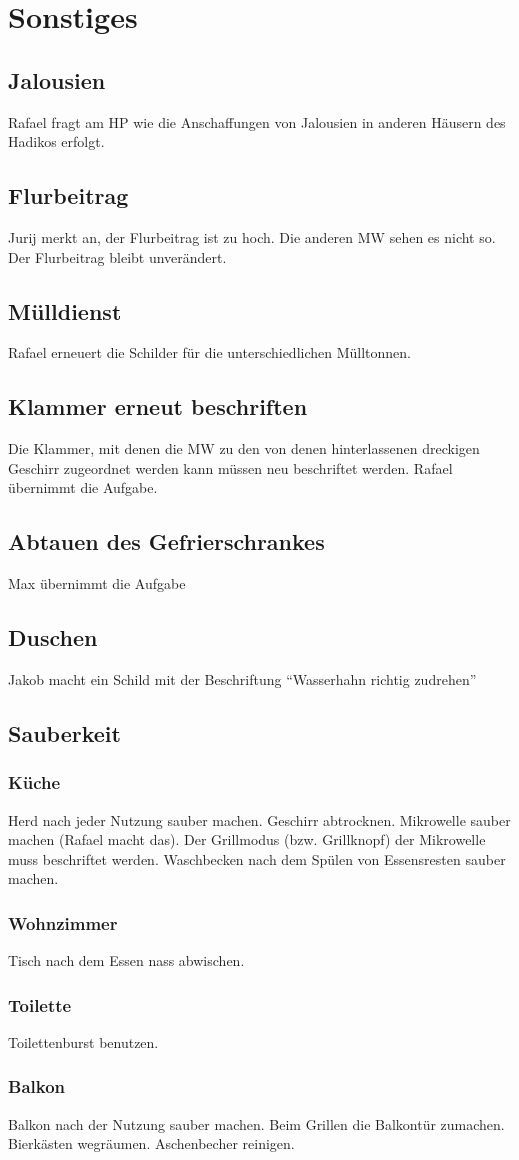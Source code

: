 \documentclass[10pt,a4paper,final]{article}
\begin{document}
\section{Sonstiges}
\subsection{Jalousien}
Rafael fragt am HP wie die Anschaffungen von Jalousien in anderen Häusern des Hadikos erfolgt.
\subsection{Flurbeitrag}
Jurij merkt an, der Flurbeitrag ist zu hoch. Die anderen MW sehen es nicht so. Der Flurbeitrag bleibt unverändert.
\subsection{Mülldienst}
Rafael erneuert die Schilder für die unterschiedlichen Mülltonnen.
\subsection{Klammer erneut beschriften}
Die Klammer, mit denen die MW zu den von denen hinterlassenen dreckigen Geschirr zugeordnet werden kann müssen neu beschriftet werden. Rafael übernimmt die Aufgabe.
\subsection{Abtauen des Gefrierschrankes}
Max übernimmt die Aufgabe
\subsection{Duschen}
Jakob macht ein Schild mit der Beschriftung "`Wasserhahn richtig zudrehen"'
\subsection{Sauberkeit}
\subsubsection{Küche}
Herd nach jeder Nutzung sauber machen. Geschirr abtrocknen. Mikrowelle sauber machen (Rafael macht das). Der Grillmodus (bzw. Grillknopf) der Mikrowelle muss beschriftet werden. Waschbecken nach dem Spülen von Essensresten sauber machen.
\subsubsection{Wohnzimmer}
Tisch nach dem Essen nass abwischen.
\subsubsection{Toilette}
Toilettenburst benutzen.
\subsubsection{Balkon}
Balkon nach der Nutzung sauber machen. Beim Grillen die Balkontür zumachen. Bierkästen wegräumen. Aschenbecher reinigen.
\end{document}
